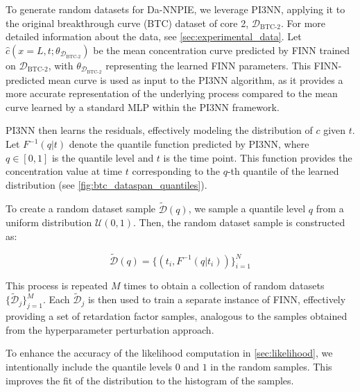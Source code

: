 To generate random datasets for Da-NNPIE, we leverage PI3NN, applying it to the original breakthrough curve (BTC) dataset of core 2, $\mathcal{D}_{\text{BTC-2}}$. For more detailed information about the data, see \cref{sec:experimental_data}.
Let $\hat{c}(x=L,t;\theta_{\mathcal{D}_{\text{BTC-2}}})$ be the mean concentration curve predicted by FINN trained on $\mathcal{D}_{\text{BTC-2}}$, with $\theta_{\mathcal{D}_{\text{BTC-2}}}$ representing the learned FINN parameters. This FINN-predicted mean curve is used as input to the PI3NN algorithm, as it provides a more accurate representation of the underlying process compared to the mean curve learned by a standard MLP within the PI3NN framework.

PI3NN then learns the residuals, effectively modeling the distribution of $c$ given $t$. Let $F^{-1}(q | t)$ denote the quantile function predicted by PI3NN, where $q \in [0, 1]$ is the quantile level and $t$ is the time point. This function provides the concentration value at time $t$ corresponding to the $q$-th quantile of the learned distribution (see \cref{fig:btc_dataspan_quantiles}).

To create a random dataset sample $\tilde{\mathcal{D}}(q)$, we sample a quantile level $q$ from a uniform distribution $\mathcal{U}(0, 1)$. Then, the random dataset sample is constructed as:

$$
\tilde{\mathcal{D}}(q) = \{ (t_i, F^{-1}(q | t_i) ) \}_{i=1}^N
$$

This process is repeated $M$ times to obtain a collection of random datasets $\{\tilde{\mathcal{D}}_j\}_{j=1}^M$. Each $\tilde{\mathcal{D}}_j$ is then used to train a separate instance of FINN, effectively providing a set of retardation factor samples, analogous to the samples obtained from the hyperparameter perturbation approach.

To enhance the accuracy of the likelihood computation in \cref{sec:likelihood}, we intentionally include the quantile levels $0$ and $1$ in the random samples. This improves the fit of the distribution to the histogram of the samples.

